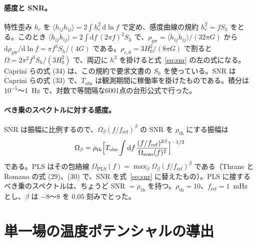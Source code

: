 \documentclass[a4paper,10pt]{ltjsarticle}
\newcommand{\dd}{\mathrm{d}}
\begin{document}
\paragraph{感度と SNR。}特性歪み $h_c$ を $\langle h_{ij}h_{ij}\rangle=2\int h_c^2\,\dd\ln f$ で定め、感度曲線の規約 $h_c^2=fS_h$ をとる。このとき $\langle\dot h_{ij}\dot h_{ij}\rangle=2\int\dd f\,(2\pi f)^2S_h$ で、$\rho_{\mathrm{gw}}=\langle\dot h_{ij}\dot h_{ij}\rangle/(32\pi G)$ から $\dd\rho_{\mathrm{gw}}/\dd\ln f=\pi f^3S_h/(4G)$ である。$\rho_{c,0}=3H_0^2/(8\pi G)$ で割ると $\Omega=2\pi^2f^3S_h/(3H_0^2)$ で、両辺に $h^2$ を掛けると式~\eqref{eq:snr} の左の式になる。Caprini らの式 (34) は、この規約で要求文書の $S_h$ を使っている。SNR は Caprini らの式 (33) で、$T_{\mathrm{obs}}$ は観測期間に稼働率を掛けたものである。積分は $10^{-5}$〜$1$~Hz で、対数で等間隔な6001点の台形公式で行った。

\paragraph{べき乗のスペクトルに対する感度。}SNR は振幅に比例するので、$\Omega_\beta(f/f_{\mathrm{ref}})^\beta$ の SNR を $\rho_{\mathrm{th}}$ にする振幅は
\begin{equation*}
\Omega_\beta=\rho_{\mathrm{th}}\Bigl[T_{\mathrm{obs}}\int\dd f\,\frac{(f/f_{\mathrm{ref}})^{2\beta}}{\Omega_{\mathrm{sens}}(f)^2}\Bigr]^{-1/2}
\end{equation*}
である。PLS はその包絡線 $\Omega_{\mathrm{PLS}}(f)=\max_\beta\Omega_\beta(f/f_{\mathrm{ref}})^\beta$ である（Thrane と Romano の式 (29)、(30) で、SNR を式~\eqref{eq:snr} に替えたもの）。PLS に接するべき乗のスペクトルは、ちょうど SNR $=\rho_{\mathrm{th}}$ を持つ。$\rho_{\mathrm{th}}=10$、$f_{\mathrm{ref}}=1$~mHz とし、$\beta$ は $-8$〜$8$ を $0.05$ 刻みでとった。

\section{単一場の温度ポテンシャルの導出}\label{app:single}
\end{document}
